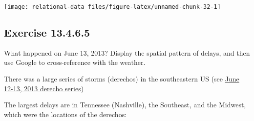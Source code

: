 \documentclass[]{book}
\newenvironment{Shaded}{\begin{snugshade}}{\end{snugshade}}
\newcommand{\DataTypeTok}[1]{\textcolor[rgb]{0.13,0.29,0.53}{#1}}
\newcommand{\KeywordTok}[1]{\textcolor[rgb]{0.13,0.29,0.53}{\textbf{#1}}}
\newcommand{\NormalTok}[1]{#1}
\newcommand{\OperatorTok}[1]{\textcolor[rgb]{0.81,0.36,0.00}{\textbf{#1}}}
\newcommand{\OtherTok}[1]{\textcolor[rgb]{0.56,0.35,0.01}{#1}}
\newcommand{\StringTok}[1]{\textcolor[rgb]{0.31,0.60,0.02}{#1}}
\theoremstyle{plain}
\theoremstyle{remark}
\begin{document}
\begin{Shaded}
\end{Shaded}

\begin{center}\texttt{[image: relational-data\_files/figure-latex/unnamed-chunk-32-1]} \end{center}

\hypertarget{exercise-13.4.6.5}{%
\subsection*{\texorpdfstring{Exercise {13.4.6.5}}{Exercise 13.4.6.5}}\label{exercise-13.4.6.5}}

What happened on June 13, 2013? Display the spatial pattern of delays, and then use Google to cross-reference with the weather.

There was a large series of storms (derechos) in the southeastern US (see \href{https://en.wikipedia.org/wiki/June_12\%E2\%80\%9313,_2013_derecho_series}{June 12-13, 2013 derecho series})

The largest delays are in Tennessee (Nashville), the Southeast, and the Midwest, which were the locations of the derechos:
\end{document}
